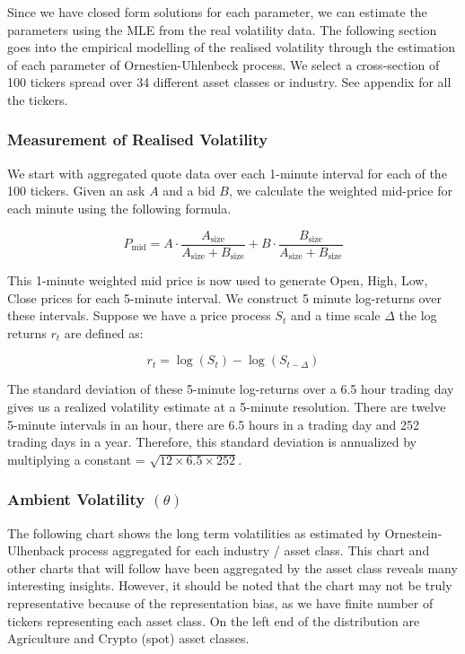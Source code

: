 Since we have closed form solutions for each parameter, we can estimate the parameters using the MLE from the real volatility data. The following section goes into the empirical modelling of the realised volatility through the estimation of each parameter of Ornestien-Uhlenbeck process. We select a cross-section of 100 tickers spread over 34 different asset classes or industry. See appendix for all the tickers.

\subsubsection{ Measurement of Realised Volatility}

We start with aggregated quote data over each 1-minute interval for each of the 100 tickers. Given an ask $A$ and a bid $B$, we calculate the weighted mid-price for each minute using the following formula.

$$
P_{\text{mid}} = A \cdot \frac{A_{\text{size}}}{A_{\text{size}} + B_{\text{size}}} + B \cdot \frac{B_{\text{size}}}{A_{\text{size}} + B_{\text{size}}}
$$

This 1-minute weighted mid price is now used to generate Open, High, Low, Close prices for each 5-minute interval. We construct 5 minute log-returns over these intervals. Suppose we have a price process $S_t$ and a time scale $\Delta$  the log returns $r_t$ are defined as:

$$	r_t = \log(S_t) - \log(S_{t-\Delta}) $$

The standard deviation of these 5-minute log-returns over a 6.5 hour trading day gives us a realized volatility estimate at a 5-minute resolution. There are twelve 5-minute intervals in an hour, there are 6.5 hours in a trading day and 252 trading days in a year. Therefore, this standard deviation is annualized by multiplying a constant = $\sqrt{12\times 6.5 \times 252}$.

\subsubsection{ Ambient Volatility $(\theta)$}

The following chart shows the long term  volatilities as estimated by Ornestein-Ulhenback process aggregated for each industry / asset class. This chart and other charts that will follow have been aggregated by the asset class reveals many interesting insights. However, it should be noted that the chart may not be truly representative because of the representation bias, as we have finite number of tickers representing each asset class. On the left end of the distribution are Agriculture and Crypto (spot) asset classes.  

